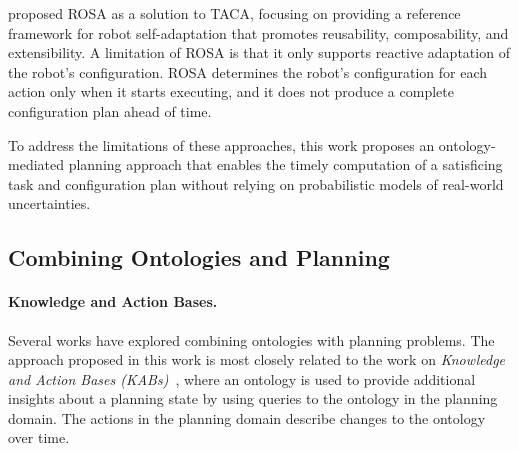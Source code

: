 \citet{rosa} proposed ROSA as a solution to TACA, focusing on providing a reference framework for robot self-adaptation that promotes reusability, composability, and extensibility. A limitation of ROSA is that it only supports reactive adaptation of the robot's configuration. ROSA determines the robot's configuration for each action only when it starts executing, and it does not produce a complete configuration plan ahead of time.

To address the limitations of these approaches, this work proposes an ontology-mediated planning approach that enables the timely computation of a satisficing task and configuration plan without relying on probabilistic models of real-world uncertainties.


\subsection{Combining Ontologies and Planning}\label{planta:sec:related_ontology_planning}

\paragraph{Knowledge and Action Bases.}
Several works have explored combining ontologies with planning problems. The approach proposed in this work is most closely related to the work on \emph{Knowledge and Action Bases (KABs)}~\cite{DBLP:journals/jair/HaririCMGMF13}, where an ontology is used to provide additional insights about a planning state by using queries to the ontology in the planning domain. The actions in the planning domain describe changes to the ontology over time.

